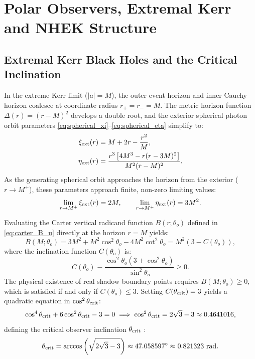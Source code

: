 \section{Polar Observers, Extremal Kerr and NHEK Structure}
\label{sec:extremal_nhek_and_polar}

\subsection{Extremal Kerr Black Holes and the Critical Inclination}
\label{subsec:extremal_kerr_critical}
In the extreme Kerr limit ($|a| = M$), the outer event horizon and inner Cauchy horizon coalesce at coordinate radius $r_+ = r_- = M$. The metric horizon function $\Delta(r) = (r - M)^2$ develops a double root, and the exterior spherical photon orbit parameters \eqref{eq:spherical_xi}--\eqref{eq:spherical_eta} simplify to:
\begin{align}
    \xi_{\rm ext}(r) &= M + 2r - \frac{r^2}{M}, \label{eq:extremal_xi} \\
    \eta_{\rm ext}(r) &= \frac{r^3\left[4M^3 - r(r - 3M)^2\right]}{M^2(r - M)^2}. \label{eq:extremal_eta}
\end{align}
As the generating spherical orbit approaches the horizon from the exterior ($r \to M^+$), these parameters approach finite, non-zero limiting values:
\begin{equation}
    \lim_{r \to M^+} \xi_{\rm ext}(r) = 2M, \qquad \lim_{r \to M^+} \eta_{\rm ext}(r) = 3M^2.
    \label{eq:extremal_horizon_limits}
\end{equation}

Evaluating the Carter vertical radicand function $B(r; \theta_o)$ defined in \eqref{eq:carter_B_u} directly at the horizon $r = M$ yields:
\begin{equation}
    B(M; \theta_o) = 3M^2 + M^2\cos^2\theta_o - 4M^2\cot^2\theta_o = M^2 \left( 3 - C(\theta_o) \right),
    \label{eq:B_horizon_extremal}
\end{equation}
where the inclination function $C(\theta_o)$ is:
\begin{equation}
    C(\theta_o) \equiv \frac{\cos^2\theta_o \left(3 + \cos^2\theta_o\right)}{\sin^2\theta_o} \ge 0.
    \label{eq:def_C_theta}
\end{equation}
The physical existence of real shadow boundary points requires $B(M; \theta_o) \ge 0$, which is satisfied if and only if $C(\theta_o) \le 3$. Setting $C(\theta_{\rm crit}) = 3$ yields a quadratic equation in $\cos^2\theta_{\rm crit}$:
\begin{equation}
    \cos^4\theta_{\rm crit} + 6\cos^2\theta_{\rm crit} - 3 = 0 \implies \cos^2\theta_{\rm crit} = 2\sqrt{3} - 3 \approx 0.4641016,
    \label{eq:theta_crit_derivation}
\end{equation}
defining the critical observer inclination $\theta_{\rm crit}$ \cite{Bardeen1973,Gralla2020}:
\begin{equation}
    \theta_{\rm crit} = \arccos\left(\sqrt{2\sqrt{3} - 3}\right) \approx 47.058597^\circ \approx 0.821323 \text{ rad}.
    \label{eq:theta_crit_val}
\end{equation}

